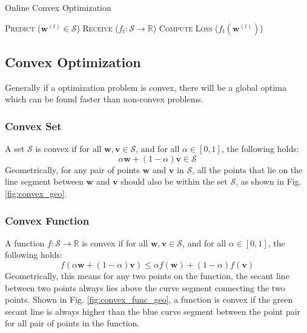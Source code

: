 \documentclass[11pt]{article}
\begin{document}
\begin{algorithm}
  \caption{Online Convex Optimization}\label{alg:oco}
  \begin{algorithmic}[1]
            \State \textsc{Predict} ($\bm{w}^{(t)} \in \mathcal{S}$) 
            \State \textsc{Receive} ($f_t : \mathcal{S} \rightarrow \mathbb{R}$) 
            \State \textsc{Compute Loss} ($f_t (\bm{w}^{(t)})$)
        \EndFor
    \EndFunction
  \end{algorithmic}
\end{algorithm}

\subsection{Convex Optimization}

Generally if a optimization problem is convex, there will be a global optima which can be found faster than non-convex problems.

\subsubsection{Convex Set}
A set $\mathcal{S}$ is convex if for all $\bm{w}, \bm{v} \in \mathcal{S}$, and for all $\alpha \in [0, 1]$, the following holds:
\begin{equation*}
    \alpha \bm{w} + (1 - \alpha) \bm{v} \in \mathcal{S}
\end{equation*}
Geometrically, for any pair of points $\bm{w}$ and $\bm{v}$ in $\mathcal{S}$, all the points that lie on the line segment between $\bm{w}$ and $\bm{v}$ should also be within the set $\mathcal{S}$, as shown in Fig. \ref{fig:convex_geo}.

\subsubsection{Convex Function}
A function $f : \mathcal{S} \rightarrow \mathbb{R}$ is convex if for all $\bm{w}, \bm{v} \in \mathcal{S}$, and for all $\alpha \in [0, 1]$, the following holds:
\begin{equation*}
    f(\alpha \bm{w} + (1 - \alpha) \bm{v}) \leq \alpha f(\bm{w}) + (1 - \alpha) f(\bm{v})
\end{equation*}
Geometrically, this means for any two points on the function, the secant line between two points always lies above the curve segment connecting the two points. Shown in Fig. \ref{fig:convex_func_geo}, a function is convex if the green secant line is always higher than the blue curve segment between the point pair for all pair of points in the function.
\end{document}
